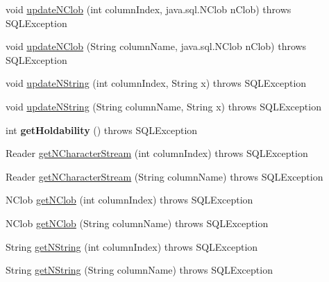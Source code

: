 \begin{DoxyCompactItemize}
\item 
void \mbox{\hyperlink{classcom_1_1mysql_1_1jdbc_1_1_j_d_b_c4_updatable_result_set_a5879920869f38b41dd3e54c1896a03da}{update\+N\+Clob}} (int column\+Index, java.\+sql.\+N\+Clob n\+Clob)  throws S\+Q\+L\+Exception 
\item 
void \mbox{\hyperlink{classcom_1_1mysql_1_1jdbc_1_1_j_d_b_c4_updatable_result_set_a5b0551f803fdd92d96b4d615c9e43179}{update\+N\+Clob}} (String column\+Name, java.\+sql.\+N\+Clob n\+Clob)  throws S\+Q\+L\+Exception 
\item 
void \mbox{\hyperlink{classcom_1_1mysql_1_1jdbc_1_1_j_d_b_c4_updatable_result_set_acbeb1ce191cafe06f0932661770954f6}{update\+N\+String}} (int column\+Index, String x)  throws S\+Q\+L\+Exception 
\item 
void \mbox{\hyperlink{classcom_1_1mysql_1_1jdbc_1_1_j_d_b_c4_updatable_result_set_ab67b1ef75d44720f30b8b976b73d6ec5}{update\+N\+String}} (String column\+Name, String x)  throws S\+Q\+L\+Exception 
\item 
\mbox{\label{classcom_1_1mysql_1_1jdbc_1_1_j_d_b_c4_updatable_result_set_ac83e6b95ea363a4e0bf92ef923f45eb9}} 
int {\bfseries get\+Holdability} ()  throws S\+Q\+L\+Exception 
\item 
Reader \mbox{\hyperlink{classcom_1_1mysql_1_1jdbc_1_1_j_d_b_c4_updatable_result_set_a9abc20c9e184a65a0895a24ff6ce7c3c}{get\+N\+Character\+Stream}} (int column\+Index)  throws S\+Q\+L\+Exception 
\item 
Reader \mbox{\hyperlink{classcom_1_1mysql_1_1jdbc_1_1_j_d_b_c4_updatable_result_set_ad28040d91ad0d2f2103e89935b84416f}{get\+N\+Character\+Stream}} (String column\+Name)  throws S\+Q\+L\+Exception 
\item 
N\+Clob \mbox{\hyperlink{classcom_1_1mysql_1_1jdbc_1_1_j_d_b_c4_updatable_result_set_aba4ddb87766599f6de1219a1bf1e1413}{get\+N\+Clob}} (int column\+Index)  throws S\+Q\+L\+Exception 
\item 
N\+Clob \mbox{\hyperlink{classcom_1_1mysql_1_1jdbc_1_1_j_d_b_c4_updatable_result_set_abb2658c291ff8cee90f88b5767bace90}{get\+N\+Clob}} (String column\+Name)  throws S\+Q\+L\+Exception 
\item 
String \mbox{\hyperlink{classcom_1_1mysql_1_1jdbc_1_1_j_d_b_c4_updatable_result_set_a1ae3fcafdcb02c78190318d321aa0fd2}{get\+N\+String}} (int column\+Index)  throws S\+Q\+L\+Exception 
\item 
String \mbox{\hyperlink{classcom_1_1mysql_1_1jdbc_1_1_j_d_b_c4_updatable_result_set_af34b33244f25a186c3117ba260cb8fc4}{get\+N\+String}} (String column\+Name)  throws S\+Q\+L\+Exception 

\end{DoxyCompactItemize}
